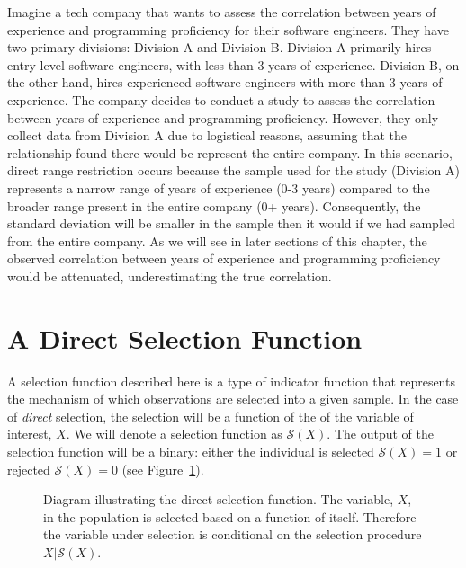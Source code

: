 \documentclass[
  letterpaper,
  DIV=11,
  numbers=noendperiod]{scrreprt}
\begin{document}
Imagine a tech company that wants to assess the correlation between
years of experience and programming proficiency for their software
engineers. They have two primary divisions: Division A and Division B.
Division A primarily hires entry-level software engineers, with less
than 3 years of experience. Division B, on the other hand, hires
experienced software engineers with more than 3 years of experience. The
company decides to conduct a study to assess the correlation between
years of experience and programming proficiency. However, they only
collect data from Division A due to logistical reasons, assuming that
the relationship found there would be represent the entire company. In
this scenario, direct range restriction occurs because the sample used
for the study (Division A) represents a narrow range of years of
experience (0-3 years) compared to the broader range present in the
entire company (0+ years). Consequently, the standard deviation will be
smaller in the sample then it would if we had sampled from the entire
company. As we will see in later sections of this chapter, the observed
correlation between years of experience and programming proficiency
would be attenuated, underestimating the true correlation.

\section{A Direct Selection Function}\label{a-direct-selection-function}

A selection function described here is a type of indicator function that
represents the mechanism of which observations are selected into a given
sample. In the case of \emph{direct} selection, the selection will be a
function of the of the variable of interest, \(X\). We will denote a
selection function as \(\mathcal{S}(X)\). The output of the selection
function will be a binary: either the individual is selected
\(\mathcal{S}(X)=1\) or rejected \(\mathcal{S}(X)=0\) (see
Figure~\ref{fig-direct-select-diag}).

\begin{figure}[H]


\caption{\label{fig-direct-select-diag}Diagram illustrating the direct
selection function. The variable, \(X\), in the population is selected
based on a function of itself. Therefore the variable under selection is
conditional on the selection procedure \(X|\mathcal{S}(X)\).}

\end{figure}%
\end{document}
